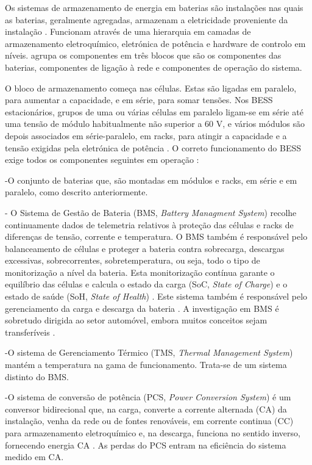 Os sistemas de armazenamento de energia em baterias são instalações nas quais as baterias, geralmente agregadas, armazenam a eletricidade proveniente da instalação \cite{enel_bess}. Funcionam através de uma hierarquia em camadas de armazenamento eletroquímico, eletrónica de potência e hardware de controlo em níveis. \textcite{ Hesse2017} agrupa os componentes em três blocos que são os componentes das baterias, componentes de ligação à rede e componentes de operação do sistema.

O bloco de armazenamento começa nas células. Estas são ligadas em paralelo, para aumentar a capacidade, e em série, para somar tensões. Nos BESS estacionários, grupos de uma ou várias células em paralelo ligam-se em série até uma tensão de módulo habitualmente não superior a 60 V, e vários módulos são depois associados em série-paralelo, em racks, para atingir a capacidade e a tensão exigidas pela eletrónica de potência \cite{ KWABENAAKYEREMEH2026}\cite{ Khalid2021}\cite{ Hesse2017}. O correto funcionamento do BESS exige todos os componentes seguintes em operação \cite{Tycorun2025}:

-O conjunto de baterias que, são montadas em módulos e racks, em série e em paralelo, como descrito anteriormente.

- O Sistema de Gestão de Bateria (BMS, \textit{Battery Managment System}) recolhe continuamente dados de telemetria relativos à proteção das células e racks de diferenças de tensão, corrente e temperatura. O BMS também é responsável pelo balanceamento de células e proteger a bateria contra sobrecarga, descargas excessivas, sobrecorrentes, sobretemperatura, ou seja, todo o tipo de monitorização a nível da bateria. Esta monitorização contínua garante o equilíbrio das células e calcula o estado da carga (SoC, \textit{State of Charge}) e o estado de saúde (SoH, \textit{State of Health}) \cite{ KWABENAAKYEREMEH2026}\cite{ Khalid2021}\cite{ MARCOSTECCA2020}. Este sistema também é responsável pelo gerenciamento da carga e descarga da bateria \cite{Tycorun2025}.  A investigação em BMS é sobretudo dirigida ao setor automóvel, embora muitos conceitos sejam transferíveis \cite{ Hesse2017}. 

-O sistema de Gerenciamento Térmico (TMS, \textit{Thermal Management System}) mantém a temperatura na gama de funcionamento. Trata-se de um sistema distinto do BMS. 

-O sistema de conversão de potência (PCS, \textit{Power Conversion System}) é um conversor bidirecional que, na carga, converte a corrente alternada (CA) da instalação, venha da rede ou de fontes renováveis, em corrente continua (CC) para armazenamento eletroquímico e, na descarga, funciona no sentido inverso, fornecendo energia CA \cite{ KWABENAAKYEREMEH2026}\cite{ Khalid2021}\cite{Tycorun2025}. As perdas do PCS entram na eficiência do sistema medido em CA. 


